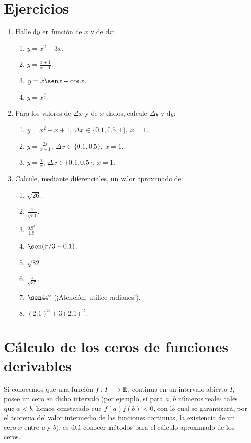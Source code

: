 \section{Ejercicios}
\begingroup
\small
\begin{multicols}{2}
\begin{enumerate}[leftmargin=*]
\item Halle $\mathrm{d}y$ en función de $x$ y de $\mathrm{d}x$:
  \begin{enumerate}
  \item $y = x^2 - 3x$.
  \item $y = \displaystyle\frac{x + 1}{x - 1}$.
  \item $\displaystyle y = x\sen x + \cos x$.
  \item $\displaystyle y = x^{\frac{2}{3}}$.
  \end{enumerate}

\item Para los valores de $\Delta x$ y de $x$ dados, calcule $\Delta y$ y $\mathrm{d}y$:
  \begin{enumerate}
  \item $\displaystyle y = x^2 + x + 1, \ \Delta x \in \{0.1, 0.5, 1\}, \ x = 1$.
  \item $\displaystyle y = \frac{2x}{x - 1}, \ \Delta x \in \{0.1, 0.5\}, \ x = 1$.
  \item $\displaystyle y = \frac{1}{x}, \ \Delta x \in \{0.1, 0.5\}, \ x = 1$.
  \end{enumerate}

\item Calcule, mediante diferenciales, un valor aproximado de:
  \begin{enumerate}
  \item $\sqrt{26}$.
  \item $\displaystyle\frac{1}{\sqrt{50}}$.
  \item $\displaystyle\frac{0.9^3}{1.9}$.
  \item $\sen(\pi/3 - 0.1)$.
  \item $\sqrt{82}$.
  \item $\displaystyle\frac{1}{\sqrt{37}}$.
  \item $\sen 44^\circ$ (¡Atención: utilice radianes!).
  \item $(2.1)^3 + 3(2.1)^2$.
  \end{enumerate}
\end{enumerate}
\end{multicols}
\endgroup

\section{Cálculo de los ceros de funciones derivables}
Si conocemos que una función $f\colon I\longrightarrow \mathbb{R}$, continua en un intervalo abierto $I$, posee un cero en dicho intervalo (por ejemplo, si para $a$, $b$ números reales tales que $a < b$, hemos constatado que $f(a)f(b) < 0$, con lo cual se garantizará, por el teorema del valor intermedio de las funciones continuas, la existencia de un cero $\overline{x}$ entre $a$ y $b$), es útil conocer métodos para el cálculo aproximado de los ceros.

